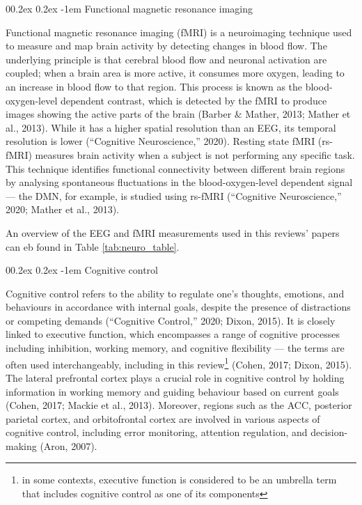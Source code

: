 \documentclass[
  stu, a4paper, 12pt,mask,floatsintext]{apa7}
\makeatletter
\let\oldparagraph\paragraph
\renewcommand{\paragraph}[1]{\oldparagraph{#1}\mbox{}}
\renewcommand{\paragraph}{\@startsection{paragraph}{4}{\parindent}%
  {0\baselineskip \@plus 0.2ex \@minus 0.2ex}%
  {-1em}%
  {\normalfont\normalsize\bfseries\itshape\typesectitle}}
\renewcommand{\paragraph}{\@startsection{paragraph}{4}{\parindent}%
  {0\baselineskip \@plus 0.2ex \@minus 0.2ex}%
  {-1em}%
  {\normalfont\normalsize\bfseries\typesectitle}}
\makeatother
\begin{document}
\paragraph{Functional magnetic resonance imaging}\label{functional-magnetic-resonance-imaging}

Functional magnetic resonance imaging (fMRI) is a neuroimaging technique used to measure and map brain activity by detecting changes in blood flow.
The underlying principle is that cerebral blood flow and neuronal activation are coupled; when a brain area is more active, it consumes more oxygen, leading to an increase in blood flow to that region.
This process is known as the blood-oxygen-level dependent contrast, which is detected by the fMRI to produce images showing the active parts of the brain (Barber \& Mather, 2013; Mather et al., 2013).
While it has a higher spatial resolution than an EEG, its temporal resolution is lower ({``Cognitive Neuroscience,''} 2020).
Resting state fMRI (rs-fMRI) measures brain activity when a subject is not performing any specific task.
This technique identifies functional connectivity between different brain regions by analysing spontaneous fluctuations in the blood-oxygen-level dependent signal --- the DMN, for example, is studied using rs-fMRI ({``Cognitive Neuroscience,''} 2020; Mather et al., 2013).

An overview of the EEG and fMRI measurements used in this reviews' papers can eb found in Table \ref{tab:neuro_table}.

\paragraph{Cognitive control}\label{cognitive-control}

Cognitive control refers to the ability to regulate one's thoughts, emotions, and behaviours in accordance with internal goals, despite the presence of distractions or competing demands ({``Cognitive Control,''} 2020; Dixon, 2015).
It is closely linked to executive function, which encompasses a range of cognitive processes including inhibition, working memory, and cognitive flexibility --- the terms are often used interchangeably, including in this review\footnote{in some contexts, executive function is considered to be an umbrella term that includes cognitive control as one of its components} (Cohen, 2017; Dixon, 2015).
The lateral prefrontal cortex plays a crucial role in cognitive control by holding information in working memory and guiding behaviour based on current goals (Cohen, 2017; Mackie et al., 2013).
Moreover, regions such as the ACC, posterior parietal cortex, and orbitofrontal cortex are involved in various aspects of cognitive control, including error monitoring, attention regulation, and decision-making (Aron, 2007).
\end{document}

